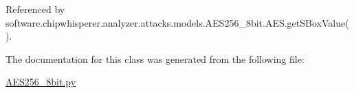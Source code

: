 Referenced by software.\+chipwhisperer.\+analyzer.\+attacks.\+models.\+A\+E\+S256\+\_\+8bit.\+A\+E\+S.\+get\+S\+Box\+Value().



The documentation for this class was generated from the following file\+:\begin{DoxyCompactItemize}
\item 
\hyperlink{AES256__8bit_8py}{A\+E\+S256\+\_\+8bit.\+py}\end{DoxyCompactItemize}
